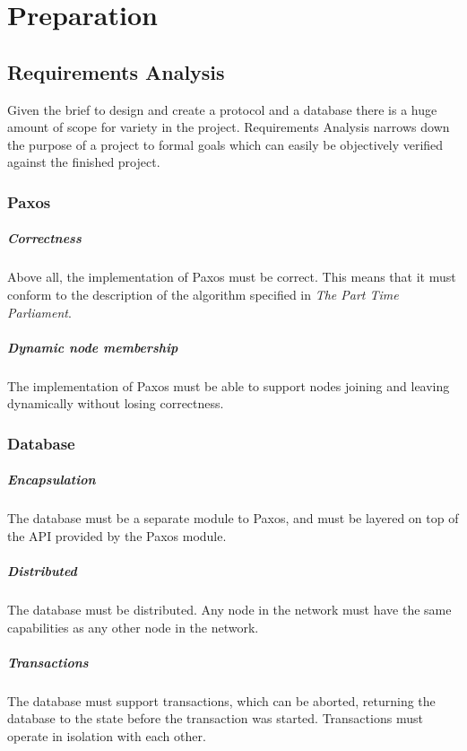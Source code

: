 \documentclass[12pt,twoside,notitlepage]{report}
\begin{document}
\cleardoublepage

\chapter{Preparation}

\section{Requirements Analysis}

Given the brief to design and create a protocol and a database there is a huge amount of scope for
variety in the project. Requirements Analysis narrows down the purpose of a project to formal
goals which can easily be objectively verified against the finished project.

\subsection*{Paxos}
\paragraph{Correctness} Above all, the implementation of Paxos must be correct. This means that it
must conform to the description of the algorithm specified in \emph{The Part Time Parliament}.
\paragraph{Dynamic node membership} The implementation of Paxos must be able to support nodes
joining and leaving dynamically without losing correctness.

\subsection*{Database}
\paragraph{Encapsulation} The database must be a separate module to Paxos, and must be layered on
top of the API provided by the Paxos module.
\paragraph{Distributed} The database must be distributed. Any node in the network must have the
same capabilities as any other node in the network.
\paragraph{Transactions} The database must support transactions, which can be aborted, returning
the database to the state before the transaction was started. Transactions must operate in
isolation with each other.
\end{document}
